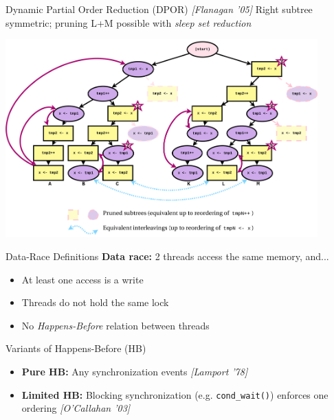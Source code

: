 \documentclass[xcolor=dvipsnames]{beamer}
\begin{document}
\begin{frame}{Dynamic Partial Order Reduction (DPOR) {\em [Flanagan '05]}}
	Right subtree symmetric; pruning L+M possible with {\em sleep set reduction}
	\begin{center}
		\includegraphics[width=0.9\textwidth]{../dpor-example-2.pdf}
	\end{center}
\end{frame}

\begin{frame}{Data-Race Definitions}
	\textbf{Data race:} 2 threads access the same memory, and...
	\begin{itemize}
		\item At least one access is a write
		\item Threads do not hold the same lock
		\item No {\em Happens-Before} relation between threads
	\end{itemize}
	\pause
	\linegap

	Variants of Happens-Before (HB)
	\begin{itemize}
		\item {\bf Pure HB:} Any synchronization events {\em [Lamport '78]}
		\item {\bf Limited HB:} Blocking synchronization (e.g. \texttt{cond\_wait()}) enforces one ordering {\em [O'Callahan '03]}
	\end{itemize}
\end{frame}
\end{document}
